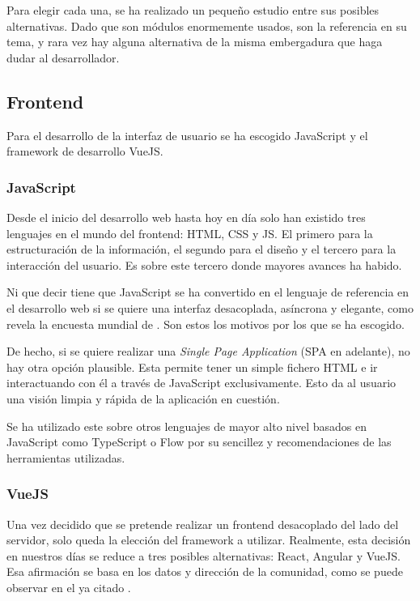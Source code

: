 Para elegir cada una, se ha realizado un pequeño estudio entre sus posibles alternativas. Dado que son módulos enormemente usados, son la referencia en su tema, y rara vez hay alguna alternativa de la misma embergadura que haga dudar al desarrollador.

\subsection{Frontend}
Para el desarrollo de la interfaz de usuario se ha escogido JavaScript y el framework de desarrollo VueJS.

\subsubsection{JavaScript}
Desde el inicio del desarrollo web hasta hoy en día solo han existido tres lenguajes en el mundo del frontend: HTML, CSS y JS. El primero para la estructuración de la información, el segundo para el diseño y el tercero para la interacción del usuario. Es sobre este tercero donde mayores avances ha habido.

Ni que decir tiene que JavaScript se ha convertido en el lenguaje de referencia en el desarrollo web si se quiere una interfaz desacoplada, asíncrona y elegante, como revela la encuesta mundial de . Son estos los motivos por los que se ha escogido.

De hecho, si se quiere realizar una \textit{Single Page Application} (SPA en adelante), no hay otra opción plausible. Esta permite tener un simple fichero HTML e ir interactuando con él a través de JavaScript exclusivamente. Esto da al usuario una visión limpia y rápida de la aplicación en cuestión.

Se ha utilizado este sobre otros lenguajes de mayor alto nivel basados en JavaScript como TypeScript o Flow por su sencillez y recomendaciones de las herramientas utilizadas.

\subsubsection{VueJS}

Una vez decidido que se pretende realizar un frontend desacoplado del lado del servidor, solo queda la elección del framework a utilizar. Realmente, esta decisión en nuestros días se reduce a tres posibles alternativas: React, Angular y VueJS. Esa afirmación se basa en los datos y dirección de la comunidad, como se puede observar en el ya citado .

